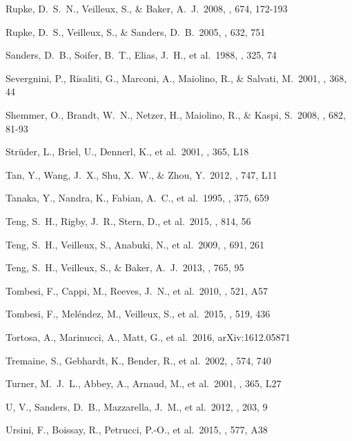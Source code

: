 \documentclass[]{emulateapj}
\begin{document}
\begin{thebibliography}{}
Rupke, D.~S.~N., Veilleux, S., \& Baker, A.~J.\ 2008, \apj, 674, 172-193 

Rupke, D.~S., Veilleux, S., \& Sanders, D.~B.\ 2005, \apj, 632, 751

Sanders, D.~B., Soifer, B.~T., Elias, J.~H., et al.\ 1988, \apj, 325, 74 

Severgnini, P., Risaliti, G., Marconi, A., Maiolino, R., \& Salvati, M.\ 2001, \aap, 368, 44 
 
Shemmer, O., Brandt, W.~N., Netzer, H., Maiolino, R., \& Kaspi, S.\ 2008, \apj, 682, 81-93 
  
Str{\"u}der, L., Briel, U., Dennerl, K., et al.\ 2001, \aap, 365, L18 

 Tan, Y., Wang, J.~X., Shu, X.~W., \& Zhou, Y.\ 2012, \apjl, 747, L11 
 
Tanaka, Y., Nandra, K., Fabian, A.~C., et al.\ 1995, \nat, 375, 659 

Teng, S.~H., Rigby, J.~R., Stern, D., et al.\ 2015, \apj, 814, 56 

Teng, S.~H., Veilleux, S., Anabuki, N., et al.\ 2009, \apj, 691, 261 

Teng, S.~H., Veilleux, S., \& Baker, A.~J.\ 2013, \apj, 765, 95 

 Tombesi, F., Cappi, M., Reeves, J.~N., et al.\ 2010, \aap, 521, A57 
 
  Tombesi, F., Mel{\'e}ndez, M., Veilleux, S., et al.\ 2015, \nat, 519, 436 
  
Tortosa, A., Marinucci, A., Matt, G., et al.\ 2016, arXiv:1612.05871 
  
Tremaine, S., Gebhardt, K., Bender, R., et al.\ 2002, \apj, 574, 740 

 Turner, M.~J.~L., Abbey, A., Arnaud, M., et al.\ 2001, \aap, 365, L27
 
 U, V., Sanders, D.~B., Mazzarella, J.~M., et al.\ 2012, \apjs, 203, 9 
 
  Ursini, F., Boissay, R., Petrucci, P.-O., et al.\ 2015, \aap, 577, A38 


\end{thebibliography}
\end{document}
